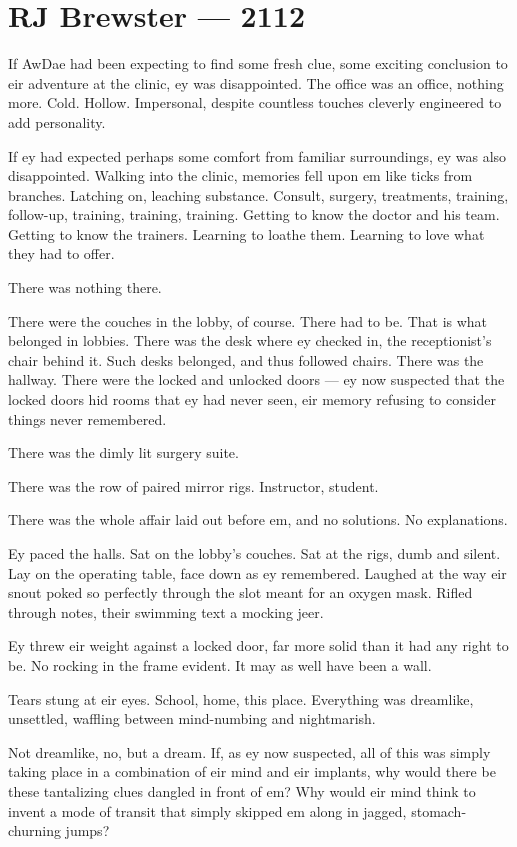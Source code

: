 \hypertarget{rj-brewster-2112}{%
\chapter*{RJ Brewster — 2112}\label{rj-brewster-2112}}

If AwDae had been expecting to find some fresh clue, some exciting conclusion to eir adventure at the clinic, ey was disappointed. The office was an office, nothing more. Cold. Hollow. Impersonal, despite countless touches cleverly engineered to add personality.

If ey had expected perhaps some comfort from familiar surroundings, ey was also disappointed. Walking into the clinic, memories fell upon em like ticks from branches. Latching on, leaching substance. Consult, surgery, treatments, training, follow-up, training, training, training. Getting to know the doctor and his team. Getting to know the trainers. Learning to loathe them. Learning to love what they had to offer.

There was nothing there.

There were the couches in the lobby, of course. There had to be. That is what belonged in lobbies. There was the desk where ey checked in, the receptionist's chair behind it. Such desks belonged, and thus followed chairs. There was the hallway. There were the locked and unlocked doors — ey now suspected that the locked doors hid rooms that ey had never seen, eir memory refusing to consider things never remembered.

There was the dimly lit surgery suite.

There was the row of paired mirror rigs. Instructor, student.

There was the whole affair laid out before em, and no solutions. No explanations.

Ey paced the halls. Sat on the lobby's couches. Sat at the rigs, dumb and silent. Lay on the operating table, face down as ey remembered. Laughed at the way eir snout poked so perfectly through the slot meant for an oxygen mask. Rifled through notes, their swimming text a mocking jeer.

Ey threw eir weight against a locked door, far more solid than it had any right to be. No rocking in the frame evident. It may as well have been a wall.

Tears stung at eir eyes. School, home, this place. Everything was dreamlike, unsettled, waffling between mind-numbing and nightmarish.

Not dreamlike, no, but a dream. If, as ey now suspected, all of this was simply taking place in a combination of eir mind and eir implants, why would there be these tantalizing clues dangled in front of em? Why would eir mind think to invent a mode of transit that simply skipped em along in jagged, stomach-churning jumps?

